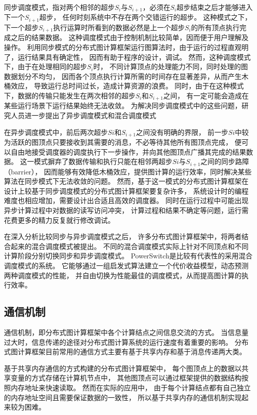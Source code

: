 同步调度模式，指对两个相邻的超步$S_i$与$S_{i+1}$，必须在$S_i$超步结束之后才能够进入下一个$S_{i+1}$超步，
任何时刻系统中不存在两个交错运行的超步。
这种模式之下，下一个超步$S_{i+1}$执行运算时所看到的数据必然是上一个超步$S_i$的所有顶点执行完成之后的结果数据。
这种调度模式由于控制机制比较简单，因而便于用户理解及操作。
利用同步模式的分布式图计算框架运行图算法时，由于运行的过程直观明了，运行结果具有确定性，
因而有助于程序的设计，调试。
然而，这种调度模式下，由于在处理相同的超步$S_i$时，
不同计算顶点的处理能力不同，同时处理的图数据划分不均匀，
因而各个顶点执行计算所需的时间存在显著差异，从而产生木桶效应，
导致运行总时间过长，造成计算资源的浪费。
同时，由于在这种模式下，数据的传输只能发生在两次相邻的超步$S_i$和$S_{i+1}$之间，
有一定可能会造成在某些运行场景下运行结果始终无法收敛。
为解决同步调度模式中的这些问题，研究人员进一步提出了异步调度模式和混合调度模式


在异步调度模式中，前后两次超步$Si$和$S_{i+1}$之间没有明确的界限，
前一步$Si$中较为活跃的图顶点只要接收到其需要的消息，不必等待其他所有图顶点完成，
便可以自由地接受调度器的调度执行下一步操作，并向其他图顶点广播其完成的结果数据。
这一模式摒弃了数据传输和执行只能在相邻两超步$Si$与$S_{i+1}$之间的同步路障（barrier），
因而能够有效降低木桶效应，提供图计算的运行效率，同时解决某些算法在同步模式下无法收敛的问题。
然而，基于这一模式的分布式图计算框架在设计上较基于同步调度模式的分布式图计算框架要复杂许多，
系统设计时的编程难度也相应增加，需要设计出合适且高效的调度器。
同时在运行过程中可能出现异步计算过程中对数据的读写访问冲突，
计算过程和结果不确定等问题，运行需花费更多的精力反复就行修改调试。

在深入分析比较同步与异步调度模式之后，
许多分布式图计算框架中，将两者结合起来的混合调度模式被提出。
不同的混合调度模式实际上针对不同顶点和不同计算阶段分别切换同步和异步调度模式。
PowerSwitch\cite{Xie@PPoPP15}是比较有代表性的采用混合调度模式的系统。
它能够通过一组启发式算法建立一个代价收益模型，动态预测两种调度模式的性能，
并自由切换为性能最佳的调度模式，从而提高图计算的执行效率。

\subsection{通信机制}

通信机制，即分布式图计算框架中各个计算结点之间信息交流的方式。
当信息量过大时，信息传递的途径对分布式图计算系统的运行速度有着重要的影响。
分布式图计算框架目前常用的通信方式主要有基于共享内存和基于消息传递两大类。

基于共享内存通信的方式构建的分布式图计算框架中，
每个图顶点上的数据以共享变量的方式存储在计算机节点中，
其他图顶点可以通过框架提供的数据结构按照内存地址来快速读取。
然而在实际的应用中，
由于每个计算结点都有自己独立的内存地址空间且需要保证数据的一致性，
所以基于共享内存的通信机制实现起来较为困难。

